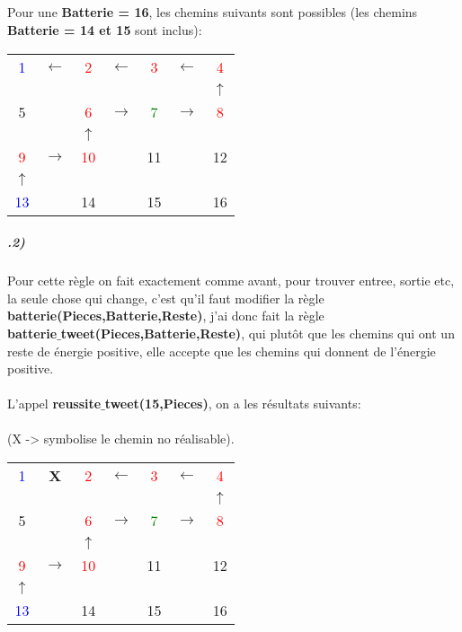 \documentclass[12pt]
{report}
\newcommand\tab[1][1cm]{\hspace*{#1}}
\begin{document}
\subparagraph*{}
\tab Pour une \textbf{Batterie = 16}, les chemins suivants sont possibles (les chemins \textbf{Batterie = 14 et 15} sont inclus):\\

\begin{center}
\begin{tabular}{|ccccccc|}
\hline
\textcolor{blue}{1} &$\leftarrow$ & \textcolor{red}{2} &$\leftarrow$ & \textcolor{red}{3} &$\leftarrow$& \textcolor{red}{4} \\
&&&&&&$\uparrow$ \\
5 & & \textcolor{red}{6} &$\rightarrow$& \textcolor{green}{7} &$\rightarrow$& \textcolor{red}{8} \\
&&$\uparrow$&&&& \\
\textcolor{red}{9} &$\rightarrow$& \textcolor{red}{10} & & 11 & & 12 \\
$\uparrow$&&&&&& \\
\textcolor{blue}{13} & & 14 & & 15 & & 16 \\
\hline
\end{tabular}
\end{center}
\subparagraph*{\textbf{.2)}}Pour cette règle on fait exactement comme avant, pour trouver entree, sortie etc, la seule chose qui change, c'est qu'il faut modifier la règle \textbf{batterie(Pieces,Batterie,Reste)}, j'ai donc fait la règle \\ \textbf{batterie$\_$tweet(Pieces,Batterie,Reste)}, qui plutôt que les chemins qui ont un reste de énergie positive, elle accepte que les chemins qui donnent de l'énergie positive.
\\ \\ \tab L'appel \textbf{reussite$\_$tweet(15,Pieces)}, on a les résultats suivants:
\\ \\ \tab (X -> symbolise le chemin no réalisable). 

\begin{center}
\begin{tabular}{|ccccccc|}
\hline
\textcolor{blue}{1} & \textbf{X} & \textcolor{red}{2} &$\leftarrow$ & \textcolor{red}{3} &$\leftarrow$& \textcolor{red}{4} \\
&&&&&&$\uparrow$ \\
5 & & \textcolor{red}{6} &$\rightarrow$& \textcolor{green}{7} &$\rightarrow$& \textcolor{red}{8} \\
&&$\uparrow$&&&& \\
\textcolor{red}{9} &$\rightarrow$& \textcolor{red}{10} & & 11 & & 12 \\
$\uparrow$&&&&&& \\
\textcolor{blue}{13} & & 14 & & 15 & & 16 \\
\hline
\end{tabular}
\end{center}
\end{document}
